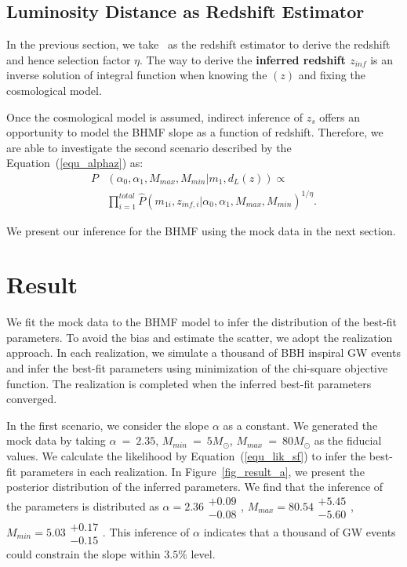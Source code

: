\documentclass[twocolumn]{aastex62}
\begin{document}
\subsection{Luminosity Distance as Redshift Estimator} 
\label{sec_dl_z}
In the previous section, we take \dl\ as the redshift estimator to derive the redshift and hence selection factor $\eta$. The way to derive the \textbf{inferred redshift $z_{inf}$} is an inverse solution of integral function when knowing the \dl$(z)$ and fixing the cosmological model.

Once the cosmological model is assumed, indirect inference of $z_s$ offers an opportunity to model the BHMF slope as a function of redshift. Therefore, we are able to investigate the second scenario described by the Equation~(\ref{equ_alphaz}) as:
 \begin{equation} \label{equ_lik_alphaz}
 \begin{split}
 P&(\alpha_0, \alpha_1, M_{max}, M_{min}|m_{1},d_L(z)) \propto \\
  &\prod_{i=1}^{total} \hat{P}(m_{1i}, z_{inf,i} |\alpha_0, \alpha_1, M_{max}, M_{min})^{1/\eta}.
  \end{split}
 \end{equation}
 
 We present our inference for the BHMF using the mock data in the next section. 


\vspace{1cm}
\section{Result}\label{sec_result}
We fit the mock data to the BHMF model to infer the distribution of the best-fit parameters. To avoid the bias and estimate the scatter, we adopt the realization approach. %
In each realization, we simulate a thousand of BBH inspiral GW events and infer the best-fit parameters using minimization of the chi-square objective function. 
The realization is completed when the inferred best-fit parameters converged.

In the first scenario, we consider the slope $\alpha$ as a constant. We generated the mock data by taking $\alpha~=~2.35$, $M_{min}~=~5M_{\odot}$, $M_{max}~=~80M_{\odot}$ as the fiducial values. We calculate the likelihood by Equation~(\ref{equ_lik_sf}) to infer the best-fit parameters in each realization. In Figure~\ref{fig_result_a}, we present the posterior distribution of the inferred parameters. We find that the inference of the parameters is distributed as $\alpha = 2.36\substack{+0.09\\-0.08}$, $M_{max} = 80.54\substack{+5.45\\-5.60}$,  $M_{min} = 5.03\substack{+0.17\\-0.15}$. This inference of $\alpha$ indicates that a thousand of GW events could constrain the slope within $3.5\%$ level.
\end{document}
